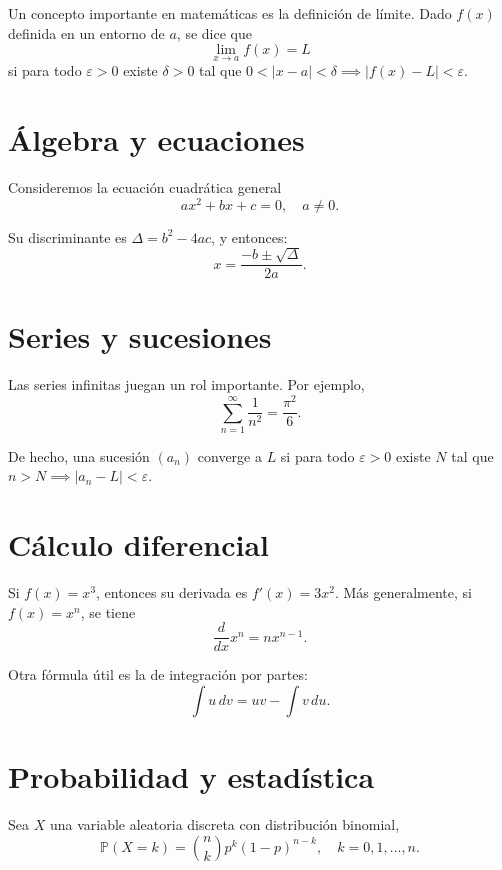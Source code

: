 \lipsum[1-2]

Un concepto importante en matemáticas es la definición de límite.  
Dado $f(x)$ definida en un entorno de $a$, se dice que
\[
  \lim_{x \to a} f(x) = L
\]
si para todo $\varepsilon > 0$ existe $\delta > 0$ tal que 
$0 < |x-a| < \delta \implies |f(x)-L| < \varepsilon$.

\lipsum[3]

\section{Álgebra y ecuaciones}
Consideremos la ecuación cuadrática general
\begin{equation}
  ax^2 + bx + c = 0, \quad a \neq 0.
\end{equation}

Su discriminante es $\Delta = b^2 - 4ac$, y entonces:
\[
  x = \frac{-b \pm \sqrt{\Delta}}{2a}.
\]

\lipsum[4-5]

\section{Series y sucesiones}
Las series infinitas juegan un rol importante. Por ejemplo,
\begin{equation}
  \sum_{n=1}^\infty \frac{1}{n^2} = \frac{\pi^2}{6}.
\end{equation}

De hecho, una sucesión $(a_n)$ converge a $L$ si para todo $\varepsilon>0$ existe $N$ tal que $n>N \implies |a_n - L| < \varepsilon$.

\lipsum[6-7]

\section{Cálculo diferencial}
Si $f(x)=x^3$, entonces su derivada es $f'(x)=3x^2$.
Más generalmente, si $f(x)=x^n$, se tiene
\begin{equation}
  \frac{d}{dx} x^n = n x^{n-1}.
\end{equation}

\lipsum[8]

Otra fórmula útil es la de integración por partes:
\[
  \int u \, dv = uv - \int v \, du.
\]

\lipsum[9-10]

\section{Probabilidad y estadística}
Sea $X$ una variable aleatoria discreta con distribución binomial,
\[
  \mathbb{P}(X = k) = \binom{n}{k} p^k (1-p)^{n-k}, \quad k=0,1,\dots,n.
\]


